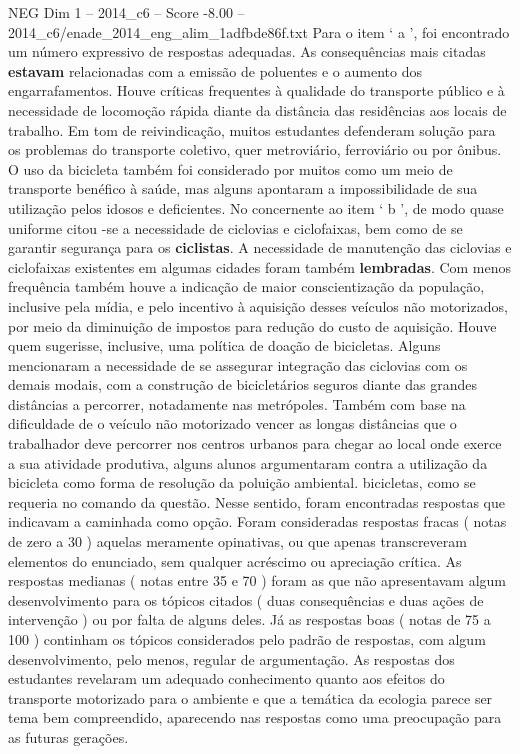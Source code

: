 \begin{textsample}{NEG Dim 1 – 2014\_c6 – Score -8.00 – 2014\_c6/enade\_2014\_eng\_alim\_1adfbde86f.txt}
Para o item ‘ a ’, foi encontrado um número expressivo de respostas adequadas.
As consequências mais citadas \textbf{estavam} relacionadas com a emissão de poluentes e o aumento dos engarrafamentos.
Houve críticas frequentes à qualidade do transporte público e à necessidade de locomoção rápida diante da distância das residências aos locais de trabalho.
Em tom de reivindicação, muitos estudantes defenderam solução para os problemas do transporte coletivo, quer metroviário, ferroviário ou por ônibus.
O uso da bicicleta também foi considerado por muitos como um meio de transporte benéfico à saúde, mas alguns apontaram a impossibilidade de sua utilização pelos idosos e deficientes.
No concernente ao item ‘ b ’, de modo quase uniforme citou -se a necessidade de ciclovias e ciclofaixas, bem como de se garantir segurança para os \textbf{ciclistas}.
A necessidade de manutenção das ciclovias e ciclofaixas existentes em algumas cidades foram também \textbf{lembradas}.
Com menos frequência também houve a indicação de maior conscientização da população, inclusive pela mídia, e pelo incentivo à aquisição desses veículos não motorizados, por meio da diminuição de impostos para redução do custo de aquisição.
Houve quem sugerisse, inclusive, uma política de doação de bicicletas.
Alguns mencionaram a necessidade de se assegurar integração das ciclovias com os demais modais, com a construção de bicicletários seguros diante das grandes distâncias a percorrer, notadamente nas metrópoles.
Também com base na dificuldade de o veículo não motorizado vencer as longas distâncias que o trabalhador deve percorrer nos centros urbanos para chegar ao local onde exerce a sua atividade produtiva, alguns alunos argumentaram contra a utilização da bicicleta como forma de resolução da poluição ambiental. bicicletas, como se requeria no comando da questão.
Nesse sentido, foram encontradas respostas que indicavam a caminhada como opção.
Foram consideradas respostas fracas ( notas de zero a 30 ) aquelas meramente opinativas, ou que apenas transcreveram elementos do enunciado, sem qualquer acréscimo ou apreciação crítica.
As respostas medianas ( notas entre 35 e 70 ) foram as que não apresentavam algum desenvolvimento para os tópicos citados ( duas consequências e duas ações de intervenção ) ou por falta de alguns deles.
Já as respostas boas ( notas de 75 a 100 ) continham os tópicos considerados pelo padrão de respostas, com algum desenvolvimento, pelo menos, regular de argumentação.
As respostas dos estudantes revelaram um adequado conhecimento quanto aos efeitos do transporte motorizado para o ambiente e que a temática da ecologia parece ser tema bem compreendido, aparecendo nas respostas como uma preocupação para as futuras gerações.

\end{textsample}
